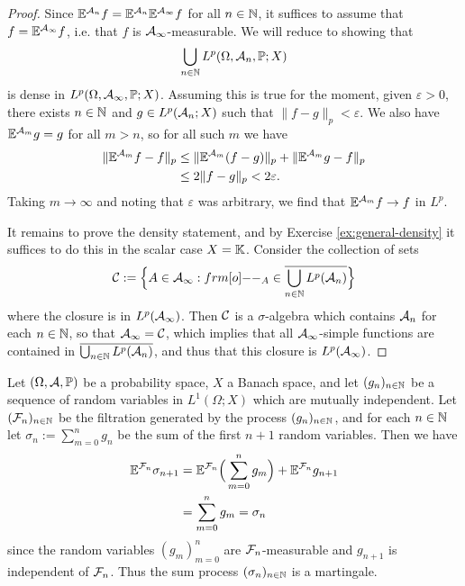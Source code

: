 \begin{proof}
  Since $\mathbb{E}^{\mathcal{A}_{n}} f = \mathbb{E}^{\mathcal{A}_{n}} \mathbb{E}^{\mathcal{A}_{\infty}} f$ for all $n \in \mathbb{N}$, it suffices to assume that $f = \mathbb{E}^{\mathcal{A}_{\infty}} f$, i.e. that $f$ is $\mathcal{A}_{\infty}$-measurable.
  We will reduce to showing that
  \begin{equation*}
    \bigcup_{n \in \mathbb{N}} L^p(\Omega,\mathcal{A}_{n},\mathbb{P};X)
  \end{equation*}
  is dense in $L^p(\Omega,\mathcal{A}_{\infty},\mathbb{P};X)$.
  Assuming this is true for the moment, given $\varepsilon > 0$, there exists $n \in \mathbb{N}$ and $g \in L^p(\mathcal{A}_{n};X)$ such that $\|f - g\|_p < \varepsilon$.
  We also have $\mathbb{E}^{\mathcal{A}_{m}} g = g$ for all $m > n$, so for all such $m$ we have
  \begin{equation*}
    \begin{aligned}
      \|\mathbb{E}^{\mathcal{A}_{m}} f - f\|_p
      &\leq \|\mathbb{E}^{\mathcal{A}_m}(f - g)\|_p + \|\mathbb{E}^{\mathcal{A}_{m}} g - f\|_p \\
      &\leq 2\|f - g\|_{p} < 2\varepsilon.
    \end{aligned}
  \end{equation*}
  Taking $m \to \infty$ and noting that $\varepsilon$ was arbitrary, we find that $\mathbb{E}^{\mathcal{A}_{m}} f \to f$ in $L^p$.

  It remains to prove the density statement, and by Exercise \ref{ex:general-density} it suffices to do this in the scalar case $X = \mathbb{K}$.
  Consider the collection of sets
  \begin{equation*}
    \mc{C} := \Big\{A \in \mc{A}_{\infty} : \1_{A} \in \overline{\bigcup_{n \in \N} L^p(\mc{A}_{n})} \Big\}
  \end{equation*}
  where the closure is in $L^p(\mathcal{A}_{\infty})$.
  Then $\mathcal{C}$ is a $\sigma$-algebra which contains $\mathcal{A}_{n}$ for each $n \in \mathbb{N}$, so that $\mathcal{A}_{\infty} = \mathcal{C}$, which implies that all $\mathcal{A}_{\infty}$-simple functions are contained in $\overline{\bigcup_{n \in \mathbb{N}} L^p(\mathcal{A}_{n})}$, and thus that this closure is $L^p(\mathcal{A}_{\infty})$.  
\end{proof}

\begin{example}\label{eg:sum-process}
  Let $(\Omega, \mathcal{A}, \mathbb{P})$ be a probability space, $X$ a Banach space, and let $(g_n)_{n \in \mathbb{N}}$ be a sequence of random variables in $L^1(\Omega;X)$ which are mutually independent.
  Let $(\mathcal{F}_n)_{n \in \mathbb{N}}$ be the filtration generated by the process $(g_n)_{n \in \mathbb{N}}$, and for each $n \in \mathbb{N}$ let $\sigma_n := \sum_{m=0}^n g_n$ be the sum of the first $n+1$ random variables.
  Then we have
  \begin{equation*}
    \begin{aligned}
      \mathbb{E}^{\mathcal{F}_n} \sigma_{n+1} &= \mathbb{E}^{\mathcal{F}_n}\Big( \sum_{m=0}^ng_m \Big) + \mathbb{E}^{\mathcal{F}_n} g_{n+1} \\
      &=\sum_{m=0}^n g_m = \sigma_n
    \end{aligned}
  \end{equation*}
  since the random variables $(g_m)_{m=0}^n$ are $\mathcal{F}_n$-measurable and $g_{n+1}$ is independent of $\mathcal{F}_n$.
  Thus the sum process $(\sigma_n)_{n \in \mathbb{N}}$ is a martingale.
\end{example}


